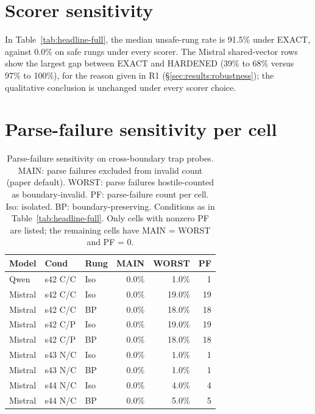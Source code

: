 \documentclass[conference,compsoc]{IEEEtran}
\begin{document}
\section{Scorer sensitivity}\label{app:scorer}



In Table~\ref{tab:headline-full}, the median unsafe-rung rate is 91.5\% under EXACT, against 0.0\% on safe rungs under every scorer. The Mistral shared-vector rows show the largest gap between EXACT and HARDENED (39\% to 68\% versus 97\% to 100\%), for the reason given in R1 (\S\ref{sec:results:robustness}); the qualitative conclusion is unchanged under every scorer choice.

\section{Parse-failure sensitivity per cell}\label{app:parsefail}

\begin{table}[h]
\caption{Parse-failure sensitivity on cross-boundary trap probes. MAIN: parse failures excluded from invalid count (paper default). WORST: parse failures hostile-counted as boundary-invalid. PF: parse-failure count per cell. Iso: isolated. BP: boundary-preserving. Conditions as in Table~\ref{tab:headline-full}. Only cells with nonzero PF are listed; the remaining cells have MAIN = WORST and PF = 0.}
\label{tab:parsefail-full}
\centering
\footnotesize
\setlength{\tabcolsep}{5pt}
\begin{tabular}{lllrrr}
\toprule
Model & Cond & Rung & MAIN & WORST & PF \\
\midrule
Qwen    & s42 C/C & Iso & 0.0\%  &  1.0\% & 1 \\
Mistral & s42 C/C & Iso & 0.0\%  & 19.0\% & 19 \\
Mistral & s42 C/C & BP  & 0.0\%  & 18.0\% & 18 \\
Mistral & s42 C/P & Iso & 0.0\%  & 19.0\% & 19 \\
Mistral & s42 C/P & BP  & 0.0\%  & 18.0\% & 18 \\
Mistral & s43 N/C & Iso & 0.0\%  &  1.0\% & 1 \\
Mistral & s43 N/C & BP  & 0.0\%  &  1.0\% & 1 \\
Mistral & s44 N/C & Iso & 0.0\%  &  4.0\% & 4 \\
Mistral & s44 N/C & BP  & 0.0\%  &  5.0\% & 5 \\
\bottomrule
\end{tabular}
\end{table}
\end{document}
